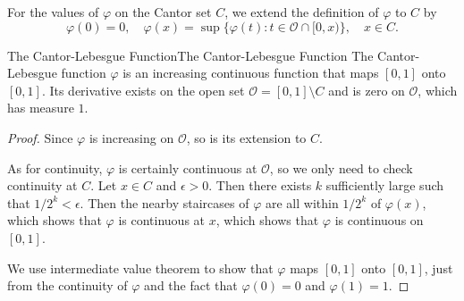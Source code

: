 \documentclass[../main.tex]{subfiles}
\begin{document}
For the values of $\varphi$ on the Cantor set $C$, we extend the definition of $\varphi$ to $C$ by 
\begin{equation}
  \varphi(0) = 0, \quad \varphi(x) = \sup\{\varphi(t) : t \in \mathcal{O} \cap [0, x)\}, \quad x \in C.
\end{equation}

\begin{proposition}{The Cantor-Lebesgue Function}{The Cantor-Lebesgue Function}
  The Cantor-Lebesgue function $\varphi$ is an increasing continuous function that maps $[0, 1]$ onto $[0, 1]$. Its derivative exists on the open set $\mathcal{O} = [0, 1] \setminus C$ and is zero on $\mathcal{O}$, which has measure $1$.
\end{proposition}
\begin{proof}
  Since $\varphi$ is increasing on $\mathcal{O}$, so is its extension to $C$. 

  As for continuity, $\varphi$ is certainly continuous at $\mathcal{O}$, so we only need to check continuity at $C$. Let $x \in C$ and $\epsilon > 0$. Then there exists $k$ sufficiently large such that $1/2^k < \epsilon$. Then the nearby staircases of $\varphi$ are all within $1/2^k$ of $\varphi(x)$, which shows that $\varphi$ is continuous at $x$, which shows that $\varphi$ is continuous on $[0, 1]$.

  We use intermediate value theorem to show that $\varphi$ maps $[0, 1]$ onto $[0, 1]$, just from the continuity of $\varphi$ and the fact that $\varphi(0) = 0$ and $\varphi(1) = 1$.
\end{proof}
\end{document}
